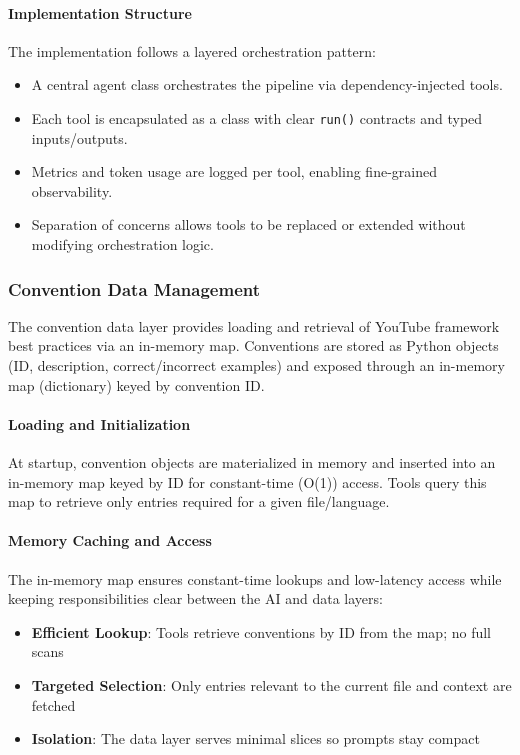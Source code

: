\begin{spacing}{1.2}
\paragraph{Implementation Structure}
The implementation follows a layered orchestration pattern:
\begin{itemize}
    \item A central agent class orchestrates the pipeline via dependency-injected tools.
    \item Each tool is encapsulated as a class with clear \texttt{run()} contracts and typed inputs/outputs.
    \item Metrics and token usage are logged per tool, enabling fine-grained observability.
    \item Separation of concerns allows tools to be replaced or extended without modifying orchestration logic.
\end{itemize}

\subsubsection{Convention Data Management}
The convention data layer provides loading and retrieval of YouTube framework best practices via an in-memory map. Conventions are stored as Python objects (ID, description, correct/incorrect examples) and exposed through an in-memory map (dictionary) keyed by convention ID.

\paragraph{Loading and Initialization}
At startup, convention objects are materialized in memory and inserted into an in-memory map keyed by ID for constant-time (O(1)) access. Tools query this map to retrieve only entries required for a given file/language.

\paragraph{Memory Caching and Access}
The in-memory map ensures constant-time lookups and low-latency access while keeping responsibilities clear between the AI and data layers:
\begin{itemize}
    \item \textbf{Efficient Lookup}: Tools retrieve conventions by ID from the map; no full scans
    \item \textbf{Targeted Selection}: Only entries relevant to the current file and context are fetched
    \item \textbf{Isolation}: The data layer serves minimal slices so prompts stay compact
\end{itemize}


\end{spacing}
